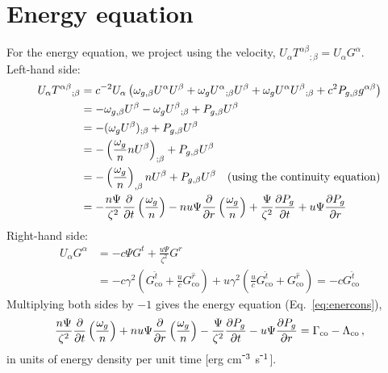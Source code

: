 \documentclass[../main.tex]{subfiles}
\begin{document}
\section*{Energy equation}
For the energy equation, we project using the velocity, $U_\alpha T^{\alpha\beta}{}_{;\beta}=U_\alpha G^\alpha$.\\
Left-hand side:
\begin{align*}
    U_\alpha T^{\alpha\beta}{}_{;\beta}&=
    c^{-2}U_\alpha\left(\omega_{g,\beta}U^\alpha U^\beta+\omega_gU^\alpha{}_{;\beta}U^\beta+\omega_gU^\alpha U^\beta{}_{;\beta}+c^2P_{g,\beta}g^{\alpha\beta}\right)\\
    &=-\omega_{g,\beta}U^\beta-\omega_gU^\beta{}_{;\beta}+P_{g,\beta}U^\beta\\
    &=-(\omega_g U^\beta)_{;\beta}+P_{g,\beta}U^\beta\\
    &=-\left(\frac{\omega_g}{n} n U^\beta\right)_{;\beta}+P_{g,\beta}U^\beta\\
    &=-\left(\frac{\omega_g}{n} \right)_{,\beta}n U^\beta+P_{g,\beta}U^\beta \quad \text{(using the continuity equation)}\\
    &=-\frac{n \Psi}{\zeta^2}\frac{\partial}{\partial t}\left(\frac{\omega_g}{n}\right)-n u\Psi\frac{\partial}{\partial r}\left(\frac{\omega_g}{n}\right)+\frac{\Psi}{\zeta^2}\frac{\partial P_g}{\partial t}+u\Psi\frac{\partial P_g}{\partial r}
\end{align*}
Right-hand side:
\begin{align*}
    U_\alpha G^\alpha&=-c\Psi G^t+\frac{u\Psi}{\zeta^2}G^r\\
    &=-c\gamma^2\left(G^{\hat{t}}_\text{co}+\frac{u}{c}G^{\hat{r}}_\text{co}\right)+u\gamma^2\left(\frac{u}{c}G^{\hat{t}}_\text{co}+G^{\hat{r}}_\text{co}\right)=-cG^{\hat{t}}_\text{co}
\end{align*}
Multiplying both sides by $-1$ gives the energy equation (Eq.~\ref{eq:enercons}),
\begin{equation}
    \frac{n \Psi}{\zeta^2}\frac{\partial}{\partial t}\left(\frac{\omega_g}{n}\right)+n u\Psi\frac{\partial}{\partial r}\left(\frac{\omega_g}{n}\right)-\frac{\Psi}{\zeta^2}\frac{\partial P_g}{\partial t}-u\Psi\frac{\partial P_g}{\partial r}=\Gamma_\text{co}-\Lambda_\text{co}\,,
\end{equation}
in units of energy density per unit time [erg cm$^{\-3}$ s$^{\-1}$].
\end{document}
